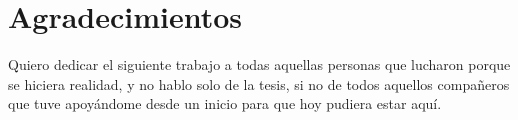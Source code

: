 \section*{Agradecimientos}
Quiero dedicar el siguiente trabajo a todas aquellas personas que lucharon porque se hiciera realidad, y no hablo solo de la tesis, si no de todos aquellos compañeros que tuve apoyándome desde un inicio para que hoy pudiera estar aquí.